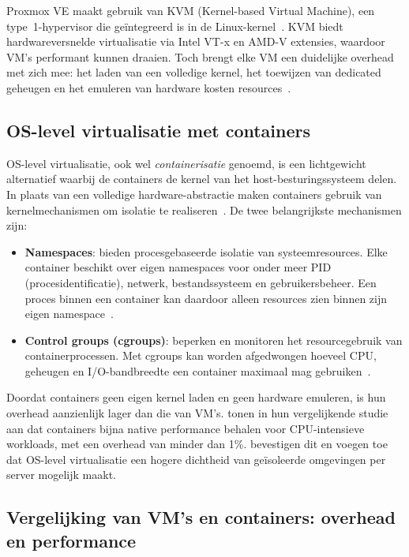 Proxmox VE maakt gebruik van KVM (Kernel-based Virtual Machine), een type~1-hypervisor die geïntegreerd is in de Linux-kernel~\autocite{ProxmoxDocs}. KVM biedt hardwareversnelde virtualisatie via Intel VT-x en AMD-V extensies, waardoor VM's performant kunnen draaien. Toch brengt elke VM een duidelijke overhead met zich mee: het laden van een volledige kernel, het toewijzen van dedicated geheugen en het emuleren van hardware kosten resources~\autocite{Felter2015}.

\subsection{OS-level virtualisatie met containers}
\label{subsec:os-level-virtualisatie}

OS-level virtualisatie, ook wel \textit{containerisatie} genoemd, is een lichtgewicht alternatief waarbij de containers de kernel van het host-besturingssysteem delen. In plaats van een volledige hardware-abstractie maken containers gebruik van kernelmechanismen om isolatie te realiseren~\autocite{Merkel2014}. De twee belangrijkste mechanismen zijn:

\begin{itemize}
    \item \textbf{Namespaces}: bieden procesgebaseerde isolatie van systeemresources. Elke container beschikt over eigen namespaces voor onder meer PID (procesidentificatie), netwerk, bestandssysteem en gebruikersbeheer. Een proces binnen een container kan daardoor alleen resources zien binnen zijn eigen namespace~\autocite{Nginx2021}.
    \item \textbf{Control groups (cgroups)}: beperken en monitoren het resourcegebruik van containerprocessen. Met cgroups kan worden afgedwongen hoeveel CPU, geheugen en I/O-bandbreedte een container maximaal mag gebruiken~\autocite{Nginx2021, SecurityLabs2023}.
\end{itemize}

Doordat containers geen eigen kernel laden en geen hardware emuleren, is hun overhead aanzienlijk lager dan die van VM's. \textcite{Felter2015} tonen in hun vergelijkende studie aan dat containers bijna native performance behalen voor CPU-intensieve workloads, met een overhead van minder dan 1\%. \textcite{Soltesz2007} bevestigen dit en voegen toe dat OS-level virtualisatie een hogere dichtheid van geïsoleerde omgevingen per server mogelijk maakt.

\subsection{Vergelijking van VM's en containers: overhead en performance}
\label{subsec:vergelijking-overhead}

